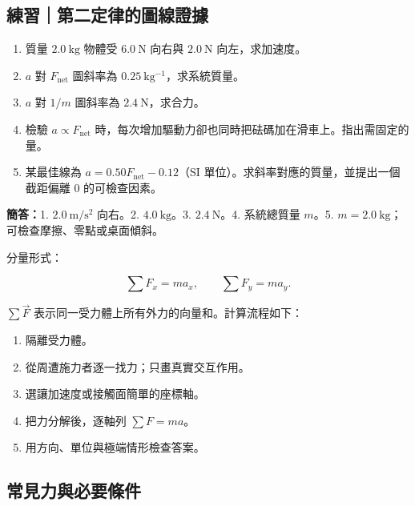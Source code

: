 \documentclass[11pt,a4paper]{article}
\providecommand{\tightlist}{%
  \setlength{\itemsep}{0pt}\setlength{\parskip}{0pt}}
\begin{document}
\begin{HandoutSelfCheck}

\subsection{練習｜第二定律的圖線證據}\label{ux7df4ux7fd2ux7b2cux4e8cux5b9aux5f8bux7684ux5716ux7ddaux8b49ux64da}

\begin{enumerate}
\def\labelenumi{\arabic{enumi}.}
\tightlist
\item
  質量 \(2.0\ \mathrm{kg}\) 物體受 \(6.0\ \mathrm N\) 向右與 \(2.0\ \mathrm N\) 向左，求加速度。
\item
  \(a\) 對 \(F_{\mathrm{net}}\) 圖斜率為 \(0.25\ \mathrm{kg^{-1}}\)，求系統質量。
\item
  \(a\) 對 \(1/m\) 圖斜率為 \(2.4\ \mathrm N\)，求合力。
\item
  檢驗 \(a\propto F_{\mathrm{net}}\) 時，每次增加驅動力卻也同時把砝碼加在滑車上。指出需固定的量。
\item
  某最佳線為 \(a=0.50F_{\mathrm{net}}-0.12\)（SI 單位）。求斜率對應的質量，並提出一個截距偏離 0 的可檢查因素。
\end{enumerate}

\textbf{簡答：}1. \(2.0\ \mathrm{m/s^2}\) 向右。2. \(4.0\ \mathrm{kg}\)。3. \(2.4\ \mathrm N\)。4. 系統總質量 \(m\)。5. \(m=2.0\ \mathrm{kg}\)；可檢查摩擦、零點或桌面傾斜。

\end{HandoutSelfCheck}

分量形式：

\[
\sum F_x=ma_x,
\qquad
\sum F_y=ma_y.
\]

\(\sum\vec F\) 表示同一受力體上所有外力的向量和。計算流程如下：

\begin{enumerate}
\def\labelenumi{\arabic{enumi}.}
\tightlist
\item
  隔離受力體。
\item
  從周遭施力者逐一找力；只畫真實交互作用。
\item
  選讓加速度或接觸面簡單的座標軸。
\item
  把力分解後，逐軸列 \(\sum F=ma\)。
\item
  用方向、單位與極端情形檢查答案。
\end{enumerate}

\subsection{常見力與必要條件}\label{ux5e38ux898bux529bux8207ux5fc5ux8981ux689dux4ef6}
\end{document}

